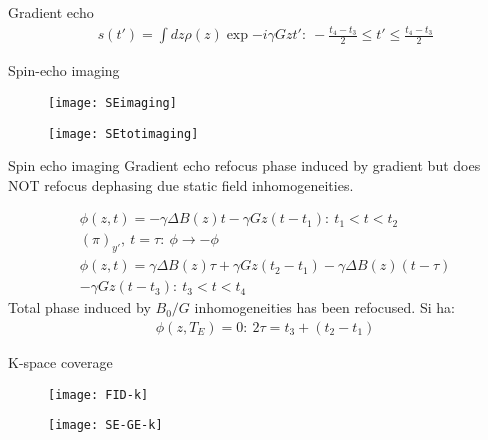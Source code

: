 \begin{wordonframe}{Gradient echo}
\begin{align*}
&s(t')=\int d z\rho(z)\exp{-i\gamma Gzt'}:\ -\frac{t_4-t_3}{2}\leq t'\leq \frac{t_4-t_3}{2}
\end{align*}
\end{wordonframe}

\begin{frame}[allowframebreaks]{Spin-echo imaging}
\begin{figure}[!ht]\texttt{[image: SEimaging]}\end{figure}
\begin{figure}[!ht]\texttt{[image: SEtotimaging]}\end{figure}
\end{frame}

\begin{wordonframe}{Spin echo imaging}
Gradient echo refocus phase induced by gradient but does NOT refocus dephasing due static field inhomogeneities.

\begin{align*}
&\phi(z,t)=-\gamma\Delta B(z)t-\gamma Gz(t-t_1):\ t_1<t<t_2\\
&(\pi)_{y'},\ t=\tau:\ \phi\to-\phi\\
&\phi(z,t)=\gamma\Delta B(z)\tau+\gamma Gz(t_2-t_1)-\gamma\Delta B(z)(t-\tau)\\
&-\gamma Gz(t-t_3):\ t_3<t<t_4
\end{align*}
Total phase induced by $B_0/G$ inhomogeneities has been refocused.
Si ha:
\begin{align*}
&\phi(z,T_E)=0:\ 2\tau=t_3+(t_2-t_1)
\end{align*}
\end{wordonframe}


\begin{frame}{K-space coverage}
\begin{figure}[!ht]\texttt{[image: FID-k]}\end{figure}

\begin{figure}[!ht]\texttt{[image: SE-GE-k]}\end{figure}
\end{frame}

